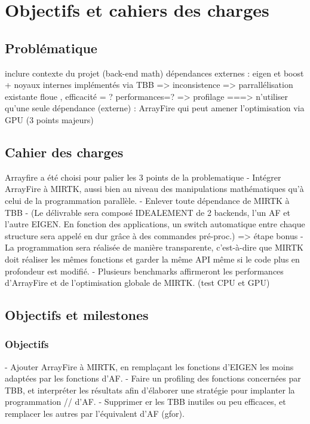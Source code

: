 \documentclass[12pt]{report}
\begin{document}
\chapter{Objectifs et cahiers des charges}
	\section{Problématique} inclure contexte du projet (back-end math) dépendances externes : eigen et boost + noyaux internes implémentés via TBB => inconsistence => parrallélisation existante floue , efficacité = ? performances=? => profilage
	===> n'utiliser qu'une seule dépendance (externe) : ArrayFire qui peut amener l'optimisation via GPU (3 points majeurs)
	 

	\section{Cahier des charges}
	Arrayfire a été choisi pour palier les 3 points de la problematique
	- Intégrer ArrayFire à MIRTK, aussi bien au niveau des manipulations mathématiques qu'à celui de la programmation parallèle.
	\newline- Enlever toute dépendance de MIRTK à TBB
	\newline- (Le délivrable sera composé IDEALEMENT de 2 backends, l'un AF et l'autre EIGEN. En fonction des applications, un switch automatique entre chaque structure sera appelé en dur grâce à des commandes pré-proc.) => étape bonus
	\newline- La programmation sera réalisée de manière transparente, c'est-à-dire que MIRTK doit réaliser les mêmes fonctions et garder la même API même si le code plus en profondeur est modifié.
	\newline- Plusieurs benchmarks affirmeront les performances d'ArrayFire et de l'optimisation globale de MIRTK. (test CPU et GPU)
	
	\section{Objectifs et milestones}
	\subsection{Objectifs}- Ajouter ArrayFire à MIRTK, en remplaçant les fonctions d'EIGEN les moins adaptées par les fonctions d'AF. \newline
	- Faire un profiling des fonctions concernées par TBB, et interpréter les résultats afin d'élaborer une stratégie pour implanter la programmation // d'AF.\newline
	- Supprimer er les TBB inutiles ou peu efficaces, et remplacer les autres par l'équivalent d'AF (gfor).\newline
	
\end{document}
